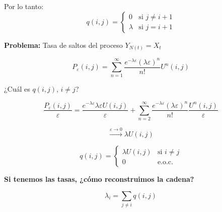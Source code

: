\documentclass[12pt,a4paper]{article}
\begin{document}
Por lo tanto:
\begin{equation*}
q(i,j) = \begin{cases}
0 & \text{si } j \neq i+1 \\
\lambda & \text{si } j = i+1
\end{cases}
\end{equation*}

\textbf{Problema:} Tasa de saltos del proceso $Y_{N(t)} = X_t$

\begin{equation*}
P_\varepsilon(i,j) = \sum_{n=1}^{\infty} \frac{e^{-\lambda\varepsilon}(\lambda\varepsilon)^n}{n!} U^n(i,j)
\end{equation*}

¿Cuál es $q(i,j)$, $i \neq j$?

\begin{equation*}
\frac{P_\varepsilon(i,j)}{\varepsilon} = \frac{e^{-\lambda\varepsilon} \lambda\varepsilon U(i,j)}{\varepsilon} + \sum_{n=2}^{\infty} \frac{e^{-\lambda\varepsilon}(\lambda\varepsilon)^n}{n!} \frac{U^n(i,j)}{\varepsilon}
\end{equation*}

\begin{equation*}
\xrightarrow{\varepsilon \to 0} \lambda U(i,j)
\end{equation*}

\begin{equation*}
q(i,j) = \begin{cases}
\lambda U(i,j) & \text{si } i \neq j \\
0 & \text{e.o.c.}
\end{cases}
\end{equation*}

\begin{center}
\end{center}


\textbf{Si tenemos las tasas, ¿cómo reconstruimos la cadena?}

\begin{equation*}
\lambda_i = \sum_{j \neq i} q(i,j)
\end{equation*}
\end{document}
